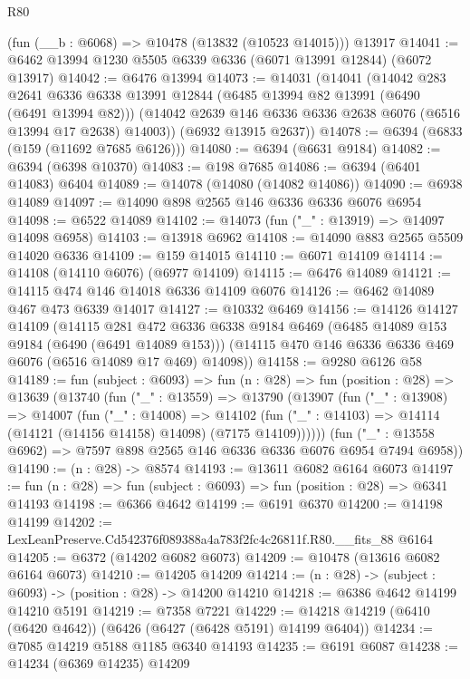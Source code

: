 \begin{lexlean}{R80}
\begin{coremodule}
    (fun (__b : @6068) => @10478 (@13832 (@10523 @14015)))
    @13917
@14041 := @6462 @13994 @1230 @5505 @6339 @6336 (@6071 @13991 @12844) (@6072 @13917)
@14042 := @6476 @13994
@14073 := @14031
    (@14041
      (@14042
        @283
        @2641
        @6336
        @6338
        @13991
        @12844
        (@6485 @13994 @82 @13991 (@6490 (@6491 @13994 @82)))
        (@14042 @2639 @146 @6336 @6336 @2638 @6076 (@6516 @13994 @17 @2638) @14003))
      (@6932 @13915 @2637))
@14078 := @6394 (@6833 (@159 (@11692 @7685 @6126)))
@14080 := @6394 (@6631 @9184)
@14082 := @6394 (@6398 @10370)
@14083 := @198 @7685
@14086 := @6394 (@6401 @14083) @6404
@14089 := @14078 (@14080 (@14082 @14086))
@14090 := @6938 @14089
@14097 := @14090 @898 @2565 @146 @6336 @6336 @6076 @6954
@14098 := @6522 @14089
@14102 := @14073 (fun ("_" : @13919) => @14097 @14098 @6958)
@14103 := @13918 @6962
@14108 := @14090 @883 @2565 @5509 @14020 @6336
@14109 := @159 @14015
@14110 := @6071 @14109
@14114 := @14108 (@14110 @6076) (@6977 @14109)
@14115 := @6476 @14089
@14121 := @14115 @474 @146 @14018 @6336 @14109 @6076
@14126 := @6462 @14089 @467 @473 @6339 @14017
@14127 := @10332 @6469
@14156 := @14126
    @14127
    @14109
    (@14115
      @281
      @472
      @6336
      @6338
      @9184
      @6469
      (@6485 @14089 @153 @9184 (@6490 (@6491 @14089 @153)))
      (@14115 @470 @146 @6336 @6336 @469 @6076 (@6516 @14089 @17 @469) @14098))
@14158 := @9280 @6126 @58
@14189 := fun (subject : @6093) =>
  fun (n : @28) =>
  fun (position : @28) =>
  @13639
    (@13740
      (fun ("_" : @13559) =>
      @13790
        (@13907
          (fun ("_" : @13908) =>
          @14007
            (fun ("_" : @14008) =>
            @14102 (fun ("_" : @14103) => @14114 (@14121 (@14156 @14158) @14098) (@7175 @14109))))))
      (fun ("_" : @13558 @6962) => @7597 @898 @2565 @146 @6336 @6336 @6076 @6954 @7494 @6958))
@14190 := (n : @28) -> @8574
@14193 := @13611 @6082 @6164 @6073
@14197 := fun (n : @28) => fun (subject : @6093) => fun (position : @28) => @6341 @14193
@14198 := @6366 @4642
@14199 := @6191 @6370
@14200 := @14198 @14199
@14202 := LexLeanPreserve.Cd542376f089388a4a783f2fc4c26811f.R80.__fits_88 @6164
@14205 := @6372 (@14202 @6082 @6073)
@14209 := @10478 (@13616 @6082 @6164 @6073)
@14210 := @14205 @14209
@14214 := (n : @28) -> (subject : @6093) -> (position : @28) -> @14200 @14210
@14218 := @6386 @4642 @14199 @14210 @5191
@14219 := @7358 @7221
@14229 := @14218 @14219 (@6410 (@6420 @4642)) (@6426 (@6427 (@6428 @5191) @14199 @6404))
@14234 := @7085 @14219 @5188 @1185 @6340 @14193
@14235 := @6191 @6087
@14238 := @14234 (@6369 @14235) @14209

\end{coremodule}
\end{lexlean}

